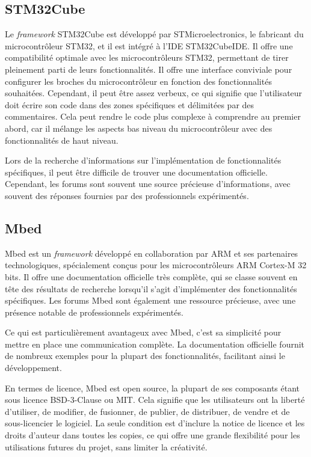 \subsection{STM32Cube}

Le \textit{\gls{framework}} STM32Cube est développé par STMicroelectronics, le fabricant du microcontrôleur STM32, et il est intégré à l'IDE STM32CubeIDE.
Il offre une compatibilité optimale avec les microcontrôleurs STM32, permettant de tirer pleinement parti de leurs fonctionnalités.
Il offre une interface conviviale pour configurer les broches du microcontrôleur en fonction des fonctionnalités souhaitées.
Cependant, il peut être assez verbeux, ce qui signifie que l'utilisateur doit écrire son code dans des zones spécifiques et délimitées par des commentaires.
Cela peut rendre le code plus complexe à comprendre au premier abord, car il mélange les aspects bas niveau du microcontrôleur avec des fonctionnalités de haut niveau.

Lors de la recherche d'informations sur l'implémentation de fonctionnalités spécifiques, il peut être difficile de trouver une documentation officielle.
Cependant, les forums sont souvent une source précieuse d'informations, avec souvent des réponses fournies par des professionnels expérimentés.

\subsection{Mbed}

Mbed est un \textit{\gls{framework}} développé en collaboration par ARM et ses partenaires technologiques, spécialement conçus pour les microcontrôleurs ARM Cortex-M 32 bits.
Il offre une documentation officielle très complète, qui se classe souvent en tête des résultats de recherche lorsqu'il s'agit d'implémenter des fonctionnalités spécifiques.
Les forums Mbed sont également une ressource précieuse, avec une présence notable de professionnels expérimentés.

Ce qui est particulièrement avantageux avec Mbed, c'est sa simplicité pour mettre en place une communication complète.
La documentation officielle fournit de nombreux exemples pour la plupart des fonctionnalités, facilitant ainsi le développement.

En termes de licence, Mbed est open source, la plupart de ses composants étant sous licence BSD-3-Clause ou MIT.
Cela signifie que les utilisateurs ont la liberté d'utiliser, de modifier, de fusionner, de publier, de distribuer, de vendre et de sous-licencier le logiciel.
La seule condition est d'inclure la notice de licence et les droits d'auteur dans toutes les copies, ce qui offre une grande flexibilité pour les utilisations futures du projet, sans limiter la créativité.

